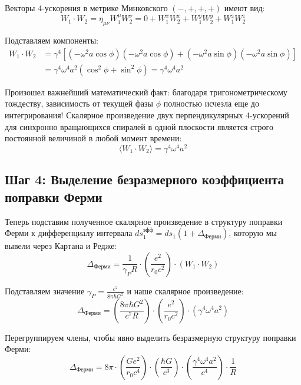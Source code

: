 \documentclass[12pt,a4paper]{article}
\begin{document}
Векторы 4-ускорения в метрике Минковского $(-, +, +, +)$ имеют вид:
\begin{equation}
W_1 \cdot W_2 = \eta_{\mu\nu} W_1^\mu W_2^\nu = 0 + W_1^x W_2^x + W_1^y W_2^y + W_1^z W_2^z
\end{equation}

Подставляем компоненты:
\begin{align}
W_1 \cdot W_2 &= \gamma^4 \left[ (-\omega^2 a \cos\phi)(-\omega^2 a \cos\phi) + (-\omega^2 a \sin\phi)(-\omega^2 a \sin\phi) \right] \\
&= \gamma^4 \omega^4 a^2 (\cos^2\phi + \sin^2\phi) = \gamma^4 \omega^4 a^2
\end{align}

Произошел важнейший математический факт: благодаря тригонометрическому тождеству, зависимость от текущей фазы $\phi$ полностью исчезла еще до интегрирования! Скалярное произведение двух перпендикулярных 4-ускорений для синхронно вращающихся спиралей в одной плоскости является строго постоянной величиной в любой момент времени:
\begin{equation}
\langle W_1 \cdot W_2 \rangle = \gamma^4 \omega^4 a^2
\end{equation}

\subsection*{Шаг 4: Выделение безразмерного коэффициента поправки Ферми}

Теперь подставим полученное скалярное произведение в структуру поправки Ферми к дифференциалу интервала $ds_1^{эфф} = ds_1(1 + \Delta_{Ферми})$, которую мы вывели через Картана и Редже:
\begin{equation}
\Delta_{Ферми} = \frac{1}{\gamma_P R} \cdot \left(\frac{e^2}{r_0 c^2}\right) \cdot (W_1 \cdot W_2)
\end{equation}

Подставляем значение $\gamma_P = \frac{c^7}{8\pi \hbar G^2}$ и наше скалярное произведение:
\begin{equation}
\Delta_{Ферми} = \left( \frac{8\pi \hbar G^2}{c^7 R} \right) \cdot \left(\frac{e^2}{r_0 c^2}\right) \cdot (\gamma^4 \omega^4 a^2)
\end{equation}

Перегруппируем члены, чтобы явно выделить безразмерную структуру поправки Ферми:
\begin{equation}
\Delta_{Ферми} = 8\pi \cdot \left( \frac{G e^2}{r_0 c^4} \right) \cdot \left( \frac{\hbar G}{c^3} \right) \cdot \left( \frac{\gamma^4 \omega^4 a^2}{c^4} \right) \cdot \frac{1}{R}
\end{equation}
\end{document}
